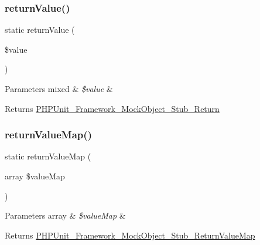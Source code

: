 \subsubsection{\texorpdfstring{return\+Value()}{returnValue()}}
{\footnotesize\ttfamily static return\+Value (\begin{DoxyParamCaption}\item[{}]{\$value }\end{DoxyParamCaption})\hspace{0.3cm}{\ttfamily [static]}}


\begin{DoxyParams}[1]{Parameters}
mixed & {\em \$value} & \\
\hline
\end{DoxyParams}
\begin{DoxyReturn}{Returns}
\mbox{\hyperlink{class_p_h_p_unit___framework___mock_object___stub___return}{P\+H\+P\+Unit\+\_\+\+Framework\+\_\+\+Mock\+Object\+\_\+\+Stub\+\_\+\+Return}} 
\end{DoxyReturn}
\mbox{\label{class_p_h_p_unit___framework___test_case_a618d8515dffaa12e45eb4b849b2ea414}} 
\subsubsection{\texorpdfstring{return\+Value\+Map()}{returnValueMap()}}
{\footnotesize\ttfamily static return\+Value\+Map (\begin{DoxyParamCaption}\item[{array}]{\$value\+Map }\end{DoxyParamCaption})\hspace{0.3cm}{\ttfamily [static]}}


\begin{DoxyParams}[1]{Parameters}
array & {\em \$value\+Map} & \\
\hline
\end{DoxyParams}
\begin{DoxyReturn}{Returns}
\mbox{\hyperlink{class_p_h_p_unit___framework___mock_object___stub___return_value_map}{P\+H\+P\+Unit\+\_\+\+Framework\+\_\+\+Mock\+Object\+\_\+\+Stub\+\_\+\+Return\+Value\+Map}} 
\end{DoxyReturn}
\mbox{\label{class_p_h_p_unit___framework___test_case_aba2e5a83092b40735a7a61c572cd6256}} 
